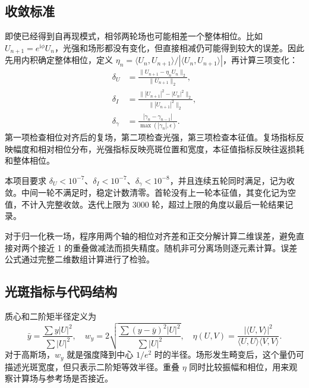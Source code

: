 \documentclass[UTF8,a4paper,11pt,fontset=fandol]{ctexart}
\newcommand{\ii}{\mathrm{i}}
\begin{document}
\subsection{收敛标准}
即使已经得到自再现模式，相邻两轮场也可能相差一个整体相位。比如 $U_{n+1}=e^{\ii\phi}U_n$，光强和场形都没有变化，但直接相减仍可能得到较大的误差。因此先用内积确定整体相位，定义 $\eta_n=\langle U_n,U_{n+1}\rangle/|\langle U_n,U_{n+1}\rangle|$，再计算三项变化：
\begin{align}
 \delta_U&=\frac{\|U_{n+1}-\eta_nU_n\|_2}{\|U_{n+1}\|_2},\\
 \delta_I&=\frac{\||U_{n+1}|^2-|U_n|^2\|_2}{\||U_{n+1}|^2\|_2},\\
 \delta_\gamma&=\frac{|\gamma_n-\gamma_{n-1}|}{\max(|\gamma_n|,\epsilon)}.
\end{align}
第一项检查相位对齐后的复场，第二项检查光强，第三项检查本征值。复场指标反映幅度和相对相位分布，光强指标反映亮斑位置和宽度，本征值指标反映往返损耗和整体相位。

本项目要求 $\delta_U<10^{-7}$、$\delta_I<10^{-7}$、$\delta_\gamma<10^{-8}$，并且连续五轮同时满足，记为收敛。中间一轮不满足时，稳定计数清零。首轮没有上一轮本征值，其变化记为空值，不计入完整收敛。迭代上限为 3000 轮，超过上限的角度以最后一轮结果记录。

对于归一化秩一场，程序用两个轴的相位对齐差和正交分解计算二维误差，避免直接对两个接近 1 的重叠做减法而损失精度。随机非可分离场则逐元素计算。误差公式通过完整二维数组计算进行了检验。

\subsection{光斑指标与代码结构}
质心和二阶矩半径定义为
\begin{equation}
 \bar y=\frac{\sum y|U|^2}{\sum |U|^2},\quad
 w_y=2\sqrt{\frac{\sum(y-\bar y)^2|U|^2}{\sum |U|^2}},\quad
 \eta(U,V)=\frac{|\langle U,V\rangle|^2}{\langle U,U\rangle\langle V,V\rangle}.
\end{equation}
对于高斯场，$w_y$ 就是强度降到中心 $1/e^2$ 时的半径。场形发生畸变后，这个量仍可描述光斑宽度，但只表示二阶矩等效半径。重叠 $\eta$ 同时比较振幅和相位，用来观察计算场与参考场是否接近。
\end{document}
